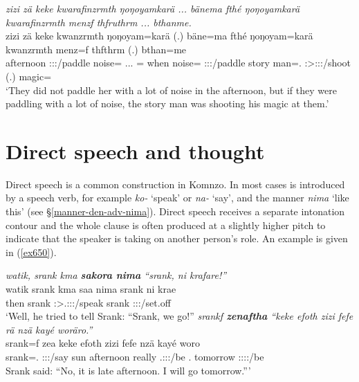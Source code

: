 \begin{exe}
	\ex \emph{zizi zä keke kwarafinzrmth ŋoŋoyamkarä ... bänema fthé ŋoŋoyamkarä kwarafinzrmth menzf thfruthrm ... bthanme.}\\
	\gll zizi zä keke kwanzrmth ŋoŋoyam=karä (.) bäne=ma fthé ŋoŋoyam=karä kwanzrmth menz=f thfthrm (.) bthan=me\\
	afternoon \Prox{} \Neg{} \Stpl:\Sbj:\Pst:\Dur/paddle noise=\Prop{} ... \Recog=\Char{} when noise=\Prop{} \Stpl:\Sbj:\Pst:\Dur/paddle {story man}=\Erg.\Sg{} \Stsg:\Sbj>\Stpl:\Obj:\Pst:\Dur/shoot (.) magic=\Ins\\
	\trans `They did not paddle her with a lot of noise in the afternoon, but if they were paddling with a lot of noise, the story man was shooting his magic at them.'
	\label{ex649}
\end{exe}

\section{Direct speech and thought}\label{directspeechthought}

Direct speech is a common construction in Komnzo. In most cases  is introduced by a speech verb, for example \emph{ko-} `speak' or \emph{na-} `say', and the manner  \emph{nima} `like this' (see \S{}\ref{manner-den-adv-nima}). Direct speech receives a separate intonation contour and the whole clause is often produced at a slightly higher pitch to indicate that the speaker is taking on another person's role. An example is given in (\ref{ex650}).

\begin{exe}
\ex \label{ex650}
\begin{xlist}
	\ex \emph{watik, srank kma \textbf{sakora nima} ``srank, ni krafare!''}\\
	\gll watik srank kma saa nima srank ni krae\\
	then srank \Pot{} \Sg:\Sbj>\Tsg.\Masc:\Obj:\Pst:\Pfv/speak \Quot{} srank \Fnsg{} \Stdu:\Sbj:\Irr:\Pfv/set.off\\
	\trans `Well, he tried to tell Srank: ``Srank, we go!''
	\ex \emph{srankf \textbf{zenaftha} ``keke efoth zizi fefe rä nzä kayé woräro.''}\\
	\gll srank=f zea keke efoth zizi fefe  nzä kayé woro\\
	srank=\Erg.\Sg{} \Sg:\Sbj:\Pst:\Ipfv/say \Neg{} sun afternoon really \Tsg.\F:\Sbj:\Nonpast:\Ipfv/be \Fsg.\Abs{} tomorrow \Fsg:\Sbj:\Nonpast:\Ipfv:\Andat/be\\
	\trans Srank said: ``No, it is late afternoon. I will go tomorrow.'''\\
\end{xlist}
\end{exe}

